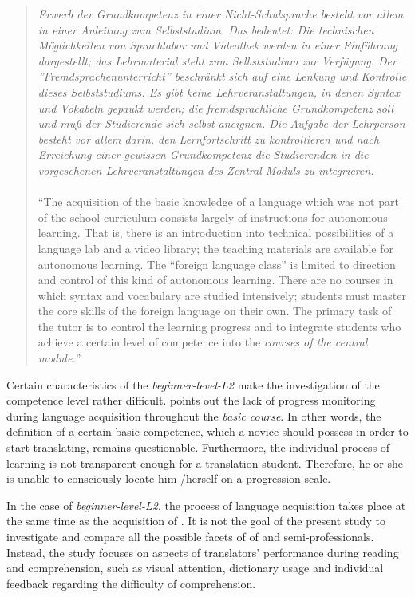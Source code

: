 \documentclass[output=paper]{langsci/langscibook.cls}
\begin{document}
\begin{quote}
\textit{%
Erwerb der Grundkompetenz in einer Nicht-Schulsprache besteht vor allem in einer Anleitung zum Selbststudium. Das bedeutet: Die technischen Möglich\-kei\-ten von Sprachlabor und Videothek werden in einer Einführung dargestellt; das Lehrmaterial steht zum Selbststudium zur Verfügung. Der \textsf{''Fremdsprachenunterricht''} beschränkt sich auf eine Lenkung und Kontrolle dieses Selbststudiums. Es gibt keine Lehrveranstaltungen, in denen Syntax und Vokabeln gepaukt werden; die fremdsprachliche Grundkompetenz soll und muß der Studierende sich selbst aneignen. Die Aufgabe der Lehrperson besteht vor allem darin, den Lernfortschritt zu kontrollieren und nach Erreichung einer gewissen Grundkompetenz die Studierenden in die vorgesehenen Lehrveranstaltungen des Zentral-Moduls zu integrieren.
}\hfill\citep[167]{Honig1995}
\\\\
``The acquisition of the basic knowledge of a language which was not part of the school curriculum consists largely of instructions for autonomous learning.  That is, there is an introduction into technical possibilities of a language lab and a video library; the teaching materials are available for autonomous learning. The ``foreign language class'' is limited to direction and control of this kind of autonomous learning. There are no courses in which syntax and vocabulary are studied intensively; students must master the core skills of the foreign language on their own. The primary task of the tutor is to control the learning progress and to integrate students who achieve a certain level of competence into the \textit{courses of the central module.}''
\end{quote}


Certain characteristics of the \textit{beginner-level-L2} make the investigation of the competence level rather difficult. \citet{PruferLeske1997} points out the lack of progress monitoring during language acquisition throughout the \textit{basic course}. In other words, the definition of a certain basic competence, which a novice should possess in order to start translating, remains questionable. Furthermore, the individual process of learning is not transparent enough for a translation student. Therefore, he or she is unable to consciously locate him-/herself on a progression scale.


In the case of \textit{beginner-level-L2}, the process of language acquisition takes place at the same time as the acquisition of . It is not the goal of the present study to investigate and compare all the possible facets of  of  and semi-professionals. Instead, the study focuses on aspects of translators' performance during reading and comprehension, such as visual attention, dictionary usage and individual feedback regarding the difficulty of comprehension. 
\end{document}
